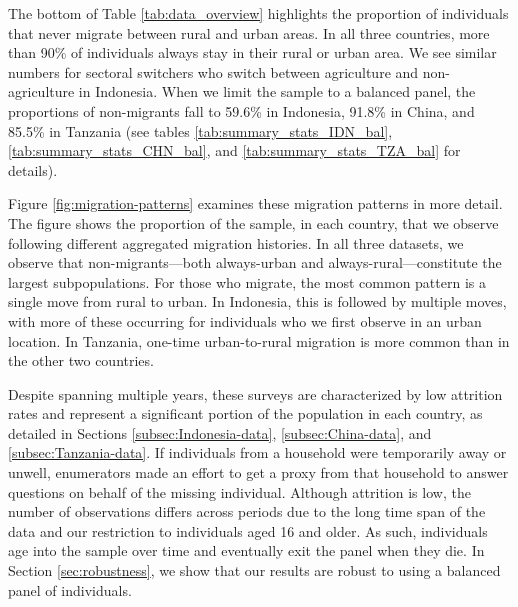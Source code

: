 \documentclass[12pt]{article}
\begin{document}
The bottom of Table \ref{tab:data_overview} highlights the proportion of individuals that never migrate between rural and urban areas. In all three countries, more than 90\% of individuals always stay in their rural or urban area.
We see similar numbers for sectoral switchers who switch between agriculture and non-agriculture in Indonesia.
When we limit the sample to a balanced panel, the proportions of non-migrants fall to 59.6\% in Indonesia, 91.8\% in China, and 85.5\% in Tanzania (see tables \ref{tab:summary_stats_IDN_bal}, \ref{tab:summary_stats_CHN_bal}, and \ref{tab:summary_stats_TZA_bal} for details). 

Figure \ref{fig:migration-patterns} examines these migration patterns in more detail.
The figure shows the proportion of the sample, in each country, that we observe following different aggregated migration histories.
In all three datasets, we observe that non-migrants---both always-urban and always-rural---constitute the largest subpopulations.
For those who migrate, the most common pattern is a single move from rural to urban. 
In Indonesia, this is followed by multiple moves, with more of these occurring for individuals who we first observe in an urban location.
In Tanzania, one-time urban-to-rural migration is more common than in the other two countries.

Despite spanning multiple years, these surveys are characterized by low attrition rates and represent a significant portion of the population in each country, as detailed in Sections \ref{subsec:Indonesia-data}, \ref{subsec:China-data}, and \ref{subsec:Tanzania-data}. 
If individuals from a household were temporarily away or unwell, enumerators made an effort to get a proxy from that household to answer questions on behalf of the missing individual. Although attrition is low, the number of observations differs across periods due to the long time span of the data and our restriction to individuals aged 16 and older. As such, individuals age into the sample over time and eventually exit the panel when they die. In Section \ref{sec:robustness}, we show that our results are robust to using a balanced panel of individuals.
\end{document}
